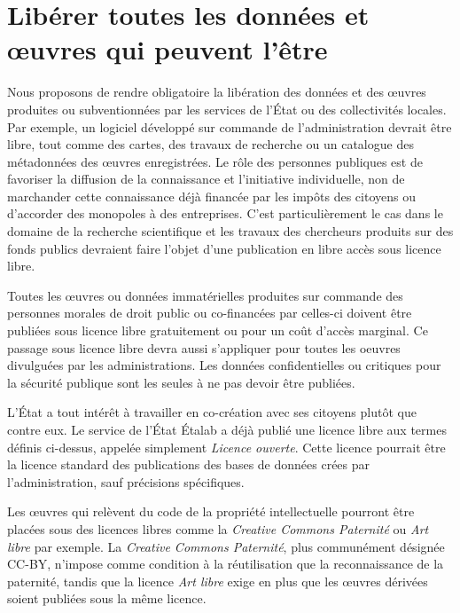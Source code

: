 \section{Libérer toutes les données et œuvres qui peuvent l'être}
Nous proposons de rendre obligatoire la libération des données et des œuvres produites ou subventionnées par les services de l’État ou des collectivités locales. Par exemple, un logiciel développé sur commande de l’administration devrait être libre, tout comme des cartes, des travaux de recherche ou un catalogue des métadonnées des œuvres enregistrées. Le rôle des personnes publiques est de favoriser la diffusion de la connaissance et l’initiative individuelle, non de marchander cette connaissance déjà financée par les impôts des citoyens ou d’accorder des monopoles à des entreprises. C'est particulièrement le cas dans le domaine de la recherche scientifique et les travaux des chercheurs produits sur des fonds publics devraient faire l'objet d'une publication en libre accès sous licence libre.

\begin{mesure}
Toutes les œuvres ou données immatérielles produites sur commande des personnes morales de droit public ou co-financées par celles-ci doivent être publiées sous licence libre gratuitement ou pour un coût d'accès marginal. Ce passage sous licence libre devra aussi s'appliquer pour toutes les oeuvres divulguées par les administrations. Les données confidentielles ou critiques pour la sécurité publique sont les seules à ne pas devoir être publiées.
\end{mesure}

L'État a tout intérêt à travailler en co-création avec ses citoyens plutôt que contre eux. Le service de l'État Étalab a déjà publié une licence libre aux termes définis ci-dessus, appelée simplement \textit{Licence ouverte}. Cette licence pourrait être la licence standard des publications des bases de données crées par l'administration, sauf précisions spécifiques. 

Les œuvres qui relèvent du code de la propriété intellectuelle pourront être placées sous des licences libres comme la \textit{Creative Commons Paternité} ou \textit{Art libre} par exemple. La \textit{Creative Commons Paternité}, plus communément désignée CC-BY, n'impose comme condition à la réutilisation que la reconnaissance de la paternité, tandis que la licence \textit{Art libre} exige en plus que les œuvres dérivées soient publiées sous la même licence.

